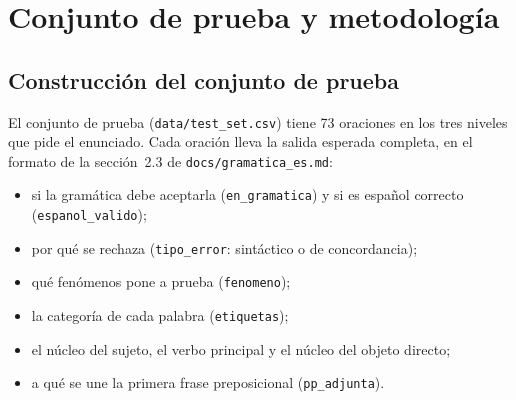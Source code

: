 \section{Conjunto de prueba y metodología}
\label{sec:set_de_prueba}


\subsection{Construcción del conjunto de prueba}

El conjunto de prueba (\texttt{data/test\_set.csv}) tiene 73 oraciones en los tres niveles que
pide el enunciado. Cada oración lleva la salida esperada completa, en el formato de la
sección~2.3 de \texttt{docs/gramatica\_es.md}:
\begin{itemize}
  \item si la gramática debe aceptarla (\texttt{en\_gramatica}) y si es español correcto
    (\texttt{espanol\_valido});
  \item por qué se rechaza (\texttt{tipo\_error}: sintáctico o de concordancia);
  \item qué fenómenos pone a prueba (\texttt{fenomeno});
  \item la categoría de cada palabra (\texttt{etiquetas});
  \item el núcleo del sujeto, el verbo principal y el núcleo del objeto directo;
  \item a qué se une la primera frase preposicional (\texttt{pp\_adjunta}).
\end{itemize}

